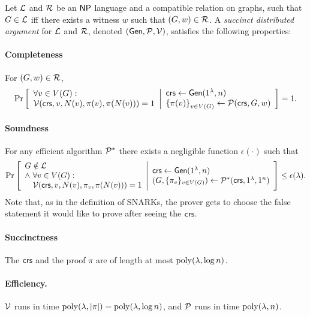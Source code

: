 
\begin{definition}\label{defSDarg}
Let $\mathcal{L}$ and $\mathcal{R}$ be an ${\mathsf{NP}}$ language and a compatible relation on graphs,
such that $G \in \mathcal{L}$ iff there exists a witness $w$ such that $(G,w) \in \mathcal{R}$.
A \emph{succinct distributed argument} for $\mathcal{L}$ and $\mathcal{R}$, denoted $(\mathsf{Gen}, \mathcal{P}, \mathcal{V})$, satisfies the following properties:
\vspace{-1ex}
\paragraph{Completeness}  For $(G,w)\in \mathcal{R}$,
\begin{gather*}
    \Pr \left[ \begin{array}{ll} 
    	\forall v \in V(G):\\
	    \mathcal{V}(\mathsf{crs}, v, N(v), \pi(v), \pi(N(v))) = 1
	 \end{array} \middle\vert \begin{array}{ll} 
    \mathsf{crs} \leftarrow \mathsf{Gen}(1^\lambda, n) \\
    \left \{{ \pi(v) } \right \}_{v\in V(G)} \leftarrow \mathcal{P}(\mathit{ \mathsf{crs} }, G, w)
     \end{array} \right]
    = 1
    .
\end{gather*}
\vspace{-1ex}
\paragraph{Soundness}
For any efficient algorithm $\mathcal{P}^*$ %
there exists a negligible function $\epsilon(\cdot)$ such that
\begin{gather*}
    \underset{}{\text{Pr}}\left [
    \begin{array}{ll}
    G\notin \mathcal{L} \\
    \wedge\ \forall v\in V(G) :\\
    \quad \mathcal{V}(\mathit{ \mathsf{crs} }, v, N(v), \pi_{v}, \pi(N(v))) = 1
    \end{array}
    \middle\vert
    \begin{array}{ll}
    \mathit{ \mathsf{crs} } \leftarrow \mathsf{Gen}(1^\lambda, n) \\
    ( G, \{\pi_{v}\}_{v\in V(G)}) \leftarrow \mathcal{P}^*(\mathit{ \mathsf{crs} }, 1^\lambda, 1^n) \\
    \end{array}
    \right ] \leq \epsilon(\lambda)
    .
\end{gather*}
Note that, as in the definition of SNARKs, the prover gets
to choose the false statement it would like to prove after seeing the $\mathsf{crs}$.

\vspace{-1ex}
\paragraph{Succinctness} The $\mathit{ \mathsf{crs} }$ and the proof $\pi$ are of length at most $\operatorname{poly}(\lambda, \log n)$.
\vspace{-1ex}
\paragraph{Efficiency.} $\mathcal{V}$ runs in time $\operatorname{poly}(\lambda, |\pi|) = \operatorname{poly}(\lambda, \log n)$,
and $\mathcal{P}$ runs in time $\operatorname{poly}(\lambda, n)$.
\end{definition}
